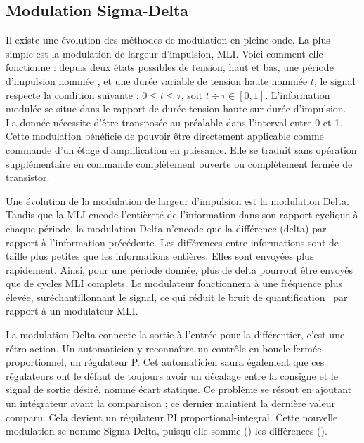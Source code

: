 \documentclass[10pt, oneside, a4paper]{article}
\begin{document}
\subsection{Modulation Sigma-Delta}
\label{sec:sigmaDelta}
Il existe une évolution des méthodes de modulation en pleine onde.
La plus simple est la modulation de largeur d'impulsion, MLI.
Voici comment elle fonctionne : depuis deux états possibles de tension, haut et bas, une période d'impulsion nommée \tau{}, et une durée variable de tension haute nommée $t$, le signal respecte la condition suivante : $0 \leq t \leq \tau $, soit $t \div \tau \in [0,1]$.
L'information modulée se situe dans le rapport de durée tension haute sur durée d'impulsion.
La donnée nécessite d'être transposée au préalable dans l'interval entre 0 et 1.
Cette modulation bénéficie de pouvoir être directement applicable comme commande d'un étage d'amplification en puissance.
Elle se traduit sans opération supplémentaire en commande complètement ouverte ou complètement fermée de transistor.

Une évolution de la modulation de largeur d'impulsion est la modulation Delta.
Tandis que la MLI encode l'entièreté de l'information dans son rapport cyclique à chaque période, la modulation Delta n'encode que la différence (delta) par rapport à l'information précédente.
Les différences entre informations sont de taille plus petites que les informations entières.
Elles sont envoyées plus rapidement.
Ainsi, pour une période donnée, plus de delta pourront être envoyés que de cycles MLI complets.
Le modulateur fonctionnera à une fréquence plus élevée, suréchantillonnant le signal, ce qui réduit le bruit de quantification~\cite{gray1998quantization} par rapport à un modulateur MLI.

La modulation Delta connecte la sortie à l'entrée pour la différentier, c'est une rétro-action.
Un automaticien y reconnaîtra un contrôle en boucle fermée proportionnel, un régulateur P.
Cet automaticien saura également que ces régulateurs ont le défaut de toujours avoir un décalage entre la consigne et le signal de sortie désiré, nommé \og{}écart statique\fg{}.
Ce problème se résout en ajoutant un intégrateur avant la comparaison ; ce dernier maintient la dernière valeur comparu.
Cela devient un régulateur PI \og{}proportional-integral\fg{}.
Cette nouvelle modulation se nomme Sigma-Delta, puisqu'elle somme (\Sigma{}) les différences (\Delta{}).
\end{document}
